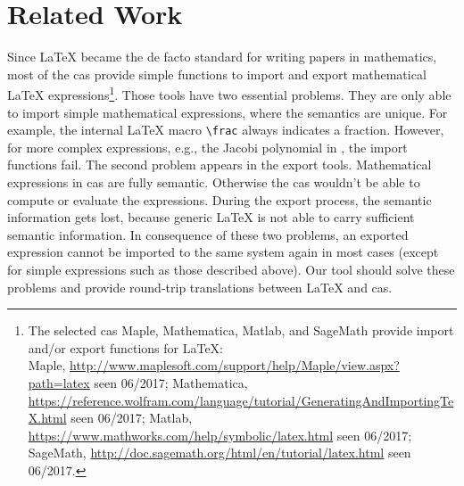 \documentclass[a4paper,11pt]{article}
\theoremstyle{defTheoStyle}
\theoremstyle{defExampStyle}
\begin{document}
\section{Related Work}\label{sec:related-work}
Since \LaTeX{} became the de facto standard for writing papers in mathematics, most of the \gls*{cas} provide simple functions to import and export mathematical \LaTeX{} expressions\footnote{The selected \gls*{cas} Maple, Mathematica, Matlab, and SageMath provide import and/or export functions for \LaTeX:\\
Maple, \url{http://www.maplesoft.com/support/help/Maple/view.aspx?path=latex} seen 06/2017;
Mathematica, \url{https://reference.wolfram.com/language/tutorial/GeneratingAndImportingTeX.html} seen 06/2017;
Matlab, \url{https://www.mathworks.com/help/symbolic/latex.html} seen 06/2017;
SageMath, \url{http://doc.sagemath.org/html/en/tutorial/latex.html} seen 06/2017.}. Those tools have two essential problems. They are only able to import simple mathematical expressions, where the semantics are unique. For example, the internal \LaTeX{} macro \verb|\frac| always indicates a fraction. However, for more complex expressions, e.g., the Jacobi polynomial in , the import functions fail. The second problem appears in the export tools. Mathematical expressions in \gls*{cas} are fully semantic. Otherwise the \gls*{cas} wouldn't be able to compute or evaluate the expressions. During the export process, the semantic information gets lost, because generic \LaTeX{} is not able to carry sufficient semantic information. In consequence of these two problems, an exported expression cannot be imported to the same system again in most cases (except for simple expressions such as those described above). Our tool should solve these problems and provide round-trip translations between \LaTeX{} and \gls*{cas}.
\end{document}
